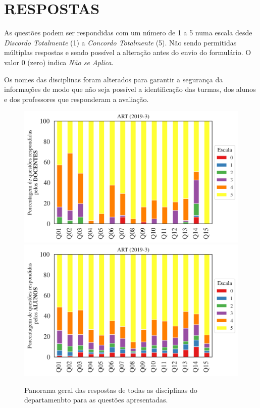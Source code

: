 \documentclass[a4paper,10pt]{article}
\begin{document}
\section{RESPOSTAS}
As questões podem ser respondidas com um número de 1 a 5 numa escala desde {\it Discordo Totalmente} (1) a {\it Concordo Totalmente} (5). Não sendo permitidas múltiplas respostas e sendo possível a alteração antes do envio do formulário. O valor 0 (zero) indica {\it Não se Aplica}.

Os nomes das disciplinas foram alterados para garantir a segurança da informações de modo que não seja possível a identificação das turmas, dos alunos  e dos professores que responderam a avaliação.

\begin{figure}[h]
\centering
\includegraphics[width=0.85\linewidth]{analise_geral_departamento_ART_docentes.png}
\includegraphics[width=0.85\linewidth]{analise_geral_departamento_ART_alunos.png}
\caption{\label{fig:analise_geral_departamento}            Panorama geral das respostas de todas as  disciplinas do departamenbto para as questões apresentadas.}
\end{figure}
\end{document}
